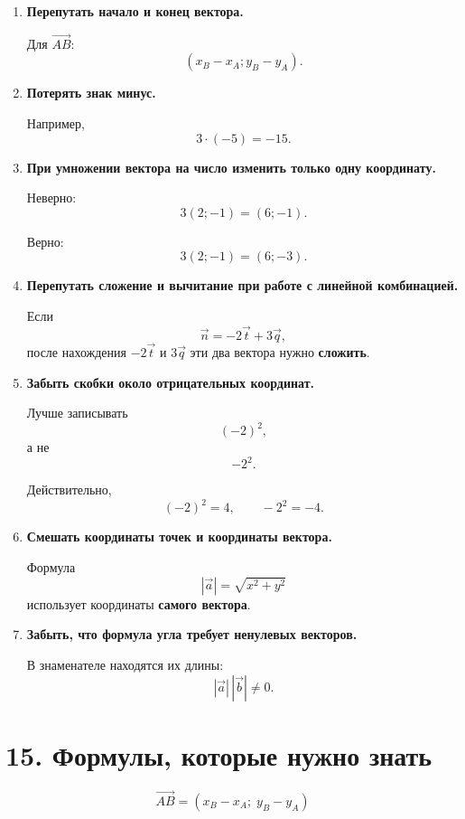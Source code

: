 \documentclass[a4paper,12pt]{article}
\newcommand{\vect}[1]{\overrightarrow{#1}}
\begin{document}
\begin{enumerate}
    \item \textbf{Перепутать начало и конец вектора.}

    Для \(\vect{AB}\):
    \[
    (x_B-x_A;y_B-y_A).
    \]

    \item \textbf{Потерять знак минус.}

    Например,
    \[
    3\cdot(-5)=-15.
    \]

    \item \textbf{При умножении вектора на число изменить только одну координату.}

    Неверно:
    \[
    3(2;-1)=(6;-1).
    \]

    Верно:
    \[
    3(2;-1)=(6;-3).
    \]

    \item \textbf{Перепутать сложение и вычитание при работе с линейной комбинацией.}

    Если
    \[
    \vec n=-2\vec t+3\vec q,
    \]
    после нахождения \(-2\vec t\) и \(3\vec q\) эти два вектора нужно
    \textbf{сложить}.

    \item \textbf{Забыть скобки около отрицательных координат.}

    Лучше записывать
    \[
    (-2)^2,
    \]
    а не
    \[
    -2^2.
    \]

    Действительно,
    \[
    (-2)^2=4,
    \qquad
    -2^2=-4.
    \]

    \item \textbf{Смешать координаты точек и координаты вектора.}

    Формула
    \[
    |\vec a|=\sqrt{x^2+y^2}
    \]
    использует координаты \textbf{самого вектора}.

    \item \textbf{Забыть, что формула угла требует ненулевых векторов.}

    В знаменателе находятся их длины:
    \[
    |\vec a|\,|\vec b|\ne0.
    \]
\end{enumerate}


\section*{\color{darkaccent}15. Формулы, которые нужно знать}

\[
\boxed{
\vect{AB}
=
(x_B-x_A;\;y_B-y_A)
}
\]
\end{document}

